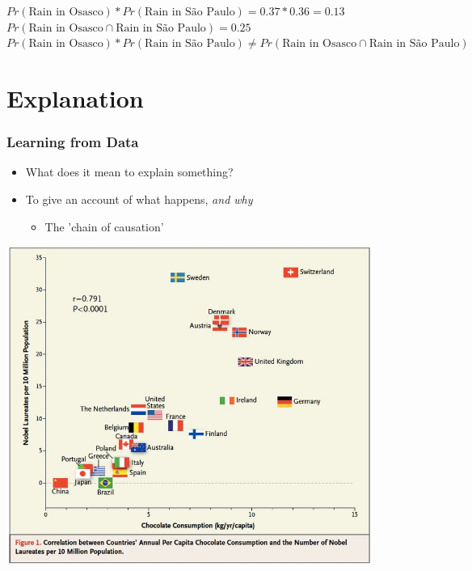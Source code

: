 \documentclass[xcolor=x11names,compress]{beamer}\usepackage[]{graphicx}\usepackage[]{color}
\newenvironment{knitrout}{}{} %
\renewcommand{\(}{\begin{columns}}
\renewcommand{\)}{\end{columns}}
\newcommand{\<}[1]{\begin{column}{#1}}
\renewcommand{\>}{\end{column}}
\begin{document}
\begin{frame}
\begin{multicols}{2}
\begin{knitrout}
\end{knitrout}
\footnotesize
$Pr(\text{Rain in Osasco})*Pr(\text{Rain in S\~{a}o Paulo}) = 0.37 * 0.36 = 0.13$ \\
$Pr(\text{Rain in Osasco} \cap  \text{Rain in S\~{a}o Paulo}) = 0.25$ \\
$Pr(\text{Rain in Osasco})*Pr(\text{Rain in S\~{a}o Paulo}) \neq Pr(\text{Rain in Osasco} \cap  \text{Rain in S\~{a}o Paulo})$ \\
\normalsize
\end{multicols}
\end{frame}

\section{Explanation}

\begin{frame}
\frametitle{Learning from Data}
\begin{itemize}
\item What does it mean to explain something?
\pause
\item To give an account of what happens, \textit{and why}
\begin{itemize}
\item The 'chain of causation'
\end{itemize}
\end{itemize}
\end{frame}

\includegraphics[width=0.9\textwidth]{Chocolate_Nobel.jpg}
\end{document}

